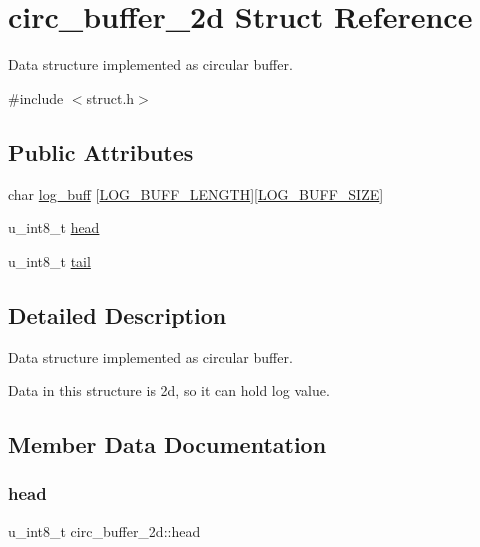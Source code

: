 \hypertarget{structcirc__buffer__2d}{}\section{circ\+\_\+buffer\+\_\+2d Struct Reference}
\label{structcirc__buffer__2d}


Data structure implemented as circular buffer.  




{\ttfamily \#include $<$struct.\+h$>$}

\subsection*{Public Attributes}
\begin{DoxyCompactItemize}
\item 
char \hyperlink{structcirc__buffer__2d_a57d57a0a528f51cf12c93e44f2f2764f}{log\+\_\+buff} \mbox{[}\hyperlink{define_8h_ab476956b4e8a58961a140862e864f62f}{L\+O\+G\+\_\+\+B\+U\+F\+F\+\_\+\+L\+E\+N\+G\+TH}\mbox{]}\mbox{[}\hyperlink{define_8h_a287d5379960755c53cdc87c6ede35c48}{L\+O\+G\+\_\+\+B\+U\+F\+F\+\_\+\+S\+I\+ZE}\mbox{]}
\item 
u\+\_\+int8\+\_\+t \hyperlink{structcirc__buffer__2d_a3d5c07026cdc4ddb0799c2efdd5c77f0}{head}
\item 
u\+\_\+int8\+\_\+t \hyperlink{structcirc__buffer__2d_ab8e3951213b81cdfd770e7f3593f0cfe}{tail}
\end{DoxyCompactItemize}


\subsection{Detailed Description}
Data structure implemented as circular buffer. 

Data in this structure is 2d, so it can hold log value. 

\subsection{Member Data Documentation}
\mbox{\label{structcirc__buffer__2d_a3d5c07026cdc4ddb0799c2efdd5c77f0}} 
\subsubsection{\texorpdfstring{head}{head}}
{\footnotesize\ttfamily u\+\_\+int8\+\_\+t circ\+\_\+buffer\+\_\+2d\+::head}

